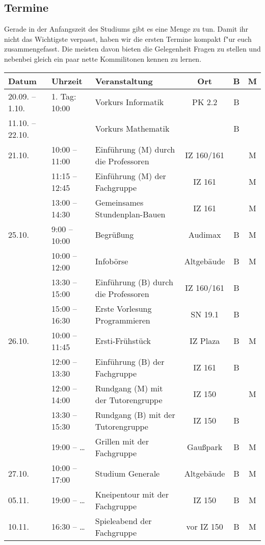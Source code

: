\subsection{Termine}
\label{termine}
Gerade in der Anfangszeit des Studiums gibt es eine Menge zu tun. Damit ihr
nicht das Wichtigste verpasst, haben wir die ersten Termine kompakt f"ur
euch zusammengefasst. Die meisten davon bieten die Gelegenheit Fragen zu
stellen und nebenbei gleich ein paar nette Kommilitonen kennen zu lernen.

\begin{tabular}{|l|l|p{6.7cm}|c|c|c|}
\hline \textbf{Datum} & \textbf{Uhrzeit} & \textbf{Veranstaltung}	& \textbf{Ort} & \textbf{B} & \textbf{M} \\
\hline 20.09. – 1.10.
				& 1. Tag: 10:00	 & Vorkurs Informatik					& PK 2.2		&B& \\
\hline 11.10. – 22.10. 
				&	 	 		 & Vorkurs Mathematik 					&				&B& \\
\hline 21.10.
				& 10:00 – 11:00	 & Einführung (M) \newline durch die Professoren	& IZ 160/161	& &M\\
\hline 			& 11:15 – 12:45	 & Einführung (M) der Fachgruppe		& IZ 161		& &M\\
\hline 			& 13:00 – 14:30	 & Gemeinsames Stundenplan-Bauen		& IZ 161		& &M\\
\hline 25.10.	&  9:00 – 10:00	 & Begrüßung							& Audimax		&B&M\\
\hline 			& 10:00 – 12:00	 & Infobörse							& Altgebäude	&B&M\\
\hline 			& 13:30 – 15:00	 & Einführung (B) \newline durch die Professoren	& IZ 160/161	&B& \\
\hline 			& 15:00 – 16:30	 & Erste Vorlesung Programmieren		& SN 19.1		&B& \\
\hline 26.10.	& 10:00 – 11:45	 & Ersti-Frühstück						& IZ Plaza		&B&M\\
\hline 			& 12:00 – 13:30	 & Einführung (B) der Fachgruppe		& IZ 161		&B& \\
\hline 			& 12:00 – 14:00	 & Rundgang (M) \newline mit der Tutorengruppe	& IZ 150		& &M\\
\hline 			& 13:30 – 15:30	 & Rundgang (B) \newline mit der Tutorengruppe	& IZ 150		&B& \\
\hline 			& 19:00 – \ldots & Grillen mit der Fachgruppe			& Gaußpark		&B&M\\
\hline 27.10.	& 10:00 – 17:00	 & Studium Generale						& Altgebäude	&B&M\\
\hline 05.11.	& 19:00 – \ldots & Kneipentour mit der Fachgruppe		& IZ 150		&B&M\\
\hline 10.11.	& 16:30 – \ldots & Spieleabend der Fachgruppe			& vor IZ 150	&B&M\\ 
\hline
\end{tabular} 


